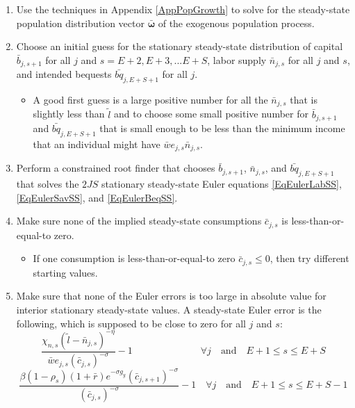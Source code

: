 \documentclass[letterpaper,12pt]{article}
\theoremstyle{definition}
\begin{document}
  \begin{enumerate}
    \item Use the techniques in Appendix \ref{AppPopGrowth} to solve for the steady-state population distribution vector $\bm{\bar{\omega}}$ of the exogenous population process.
    \item Choose an initial guess for the stationary steady-state distribution of capital $\bar{b}_{j,s+1}$ for all $j$ and $s=E+2,E+3,...E+S$, labor supply $\bar{n}_{j,s}$ for all $j$ and $s$, and intended bequests $\bar{bq}_{j,E+S+1}$ for all $j$.
      \begin{itemize}
        \item A good first guess is a large positive number for all the $\bar{n}_{j,s}$ that is slightly less than $\tilde{l}$ and to choose some small positive number for $\bar{b}_{j,s+1}$ and $\bar{bq}_{j,E+S+1}$ that is small enough to be less than the minimum income that an individual might have $\bar{w}e_{j,s}\bar{n}_{j,s}$.
      \end{itemize}
    \item Perform a constrained root finder that chooses $\bar{b}_{j,s+1}$, $\bar{n}_{j,s}$, and $\bar{bq}_{j,E+S+1}$ that solves the $2JS$ stationary steady-state Euler equations \eqref{EqEulerLabSS}, \eqref{EqEulerSavSS}, and \eqref{EqEulerBeqSS}.
    \item Make sure none of the implied steady-state consumptions $\bar{c}_{j,s}$ is less-than-or-equal-to zero.
      \begin{itemize}
        \item If one consumption is less-than-or-equal-to zero $\bar{c}_{j,s}\leq 0$, then try different starting values.
      \end{itemize}
    \item Make sure that none of the Euler errors is too large in absolute value for interior stationary steady-state values. A steady-state Euler error is the following, which is supposed to be close to zero for all $j$ and $s$:
      \begin{equation}\label{EqSSeulerrLab}
        \frac{\chi_{n,s}\left(\tilde{l}-\bar{n}_{j,s}\right)^{-\eta}}{\bar{w}e_{j,s}\left(\bar{c}_{j,s}\right)^{-\sigma}} - 1 \quad\quad\quad\quad\quad\quad\quad\forall j\quad\text{and}\quad E+1\leq s\leq E+S
      \end{equation}
      \begin{equation}\label{EqSSeulerrSav}
        \frac{\beta\left(1-\rho_s\right)\left(1+\bar{r}\right)e^{-\sigma g_y}\left(\bar{c}_{j,s+1}\right)^{-\sigma}}{\left(\bar{c}_{j,s}\right)^{-\sigma}} - 1 \quad\forall j\quad\text{and}\quad E+1\leq s\leq E+S-1

\end{equation}
\end{enumerate}
\end{document}
